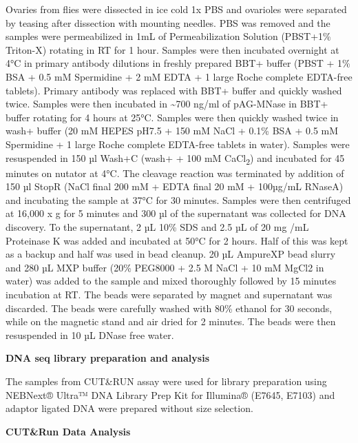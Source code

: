 \documentclass[12pt,oneside]{reedthesis}
\begin{document}
Ovaries from flies were dissected in ice cold 1x PBS and ovarioles were
separated by teasing after dissection with mounting needles. PBS was
removed and the samples were permeabilized in 1mL of Permeabilization
Solution (PBST+1\% Triton-X) rotating in RT for 1 hour. Samples were then
incubated overnight at 4°C in primary antibody dilutions in freshly
prepared BBT+ buffer (PBST + 1\% BSA + 0.5 mM Spermidine + 2 mM EDTA + 1
large Roche complete EDTA-free tablets). Primary antibody was replaced
with BBT+ buffer and quickly washed twice. Samples were then incubated
in \textasciitilde700 ng/ml of pAG-MNase in BBT+ buffer rotating for 4 hours at 25°C.
Samples were then quickly washed twice in wash+ buffer (20 mM HEPES
pH7.5 + 150 mM NaCl + 0.1\% BSA + 0.5 mM Spermidine + 1 large Roche
complete EDTA-free tablets in water). Samples were resuspended in 150 µl
Wash+C (wash+ + 100 mM CaCl\textsubscript{2}) and incubated for 45 minutes on nutator
at 4°C. The cleavage reaction was terminated by addition of 150 µl StopR
(NaCl final 200 mM + EDTA final 20 mM + 100µg/mL RNaseA) and incubating
the sample at 37°C for 30 minutes. Samples were then centrifuged at
16,000 x g for 5 minutes and 300 µl of the supernatant was collected for
DNA discovery. To the supernatant, 2 µL 10\% SDS and 2.5 µL of 20 mg /mL
Proteinase K was added and incubated at 50°C for 2 hours. Half of this
was kept as a backup and half was used in bead cleanup. 20 µL AmpureXP
bead slurry and 280 µL MXP buffer (20\% PEG8000 + 2.5 M NaCl + 10 mM
MgCl2 in water) was added to the sample and mixed thoroughly followed by
15 minutes incubation at RT. The beads were separated by magnet and
supernatant was discarded. The beads were carefully washed with 80\%
ethanol for 30 seconds, while on the magnetic stand and air dried for 2
minutes. The beads were then resuspended in 10 µL DNase free water.

\textbf{DNA seq library preparation and analysis}

The samples from CUT\&RUN assay were used for library preparation using
NEBNext® Ultra™ DNA Library Prep Kit for Illumina® (E7645, E7103) and
adaptor ligated DNA were prepared without size selection.

\textbf{CUT\&Run Data Analysis}
\end{document}
